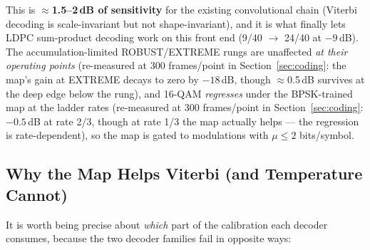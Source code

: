 This is $\approx$\textbf{1.5--2\,dB of sensitivity} for the existing
convolutional chain (Viterbi decoding is scale-invariant but not
shape-invariant), and it is what finally lets LDPC sum-product
decoding work on this front end (9/40 $\rightarrow$ 24/40 at
$-9$\,dB).  The accumulation-limited ROBUST/EXTREME rungs are
unaffected \emph{at their operating points} (re-measured at 300
frames/point in Section~\ref{sec:coding}: the map's gain at EXTREME
decays to zero by $-18$\,dB, though $\approx$0.5\,dB survives at the
deep edge below the rung), and 16-QAM \emph{regresses} under the
BPSK-trained map at the ladder rates (re-measured at 300 frames/point
in Section~\ref{sec:coding}: $-0.5$\,dB at rate 2/3, though at rate
1/3 the map actually helps --- the regression is rate-dependent), so
the map is gated to modulations with $\mu \le 2$ bits/symbol.

\subsection{Why the Map Helps Viterbi (and Temperature Cannot)}
\label{sec:viterbi_recal}

It is worth being precise about \emph{which} part of the calibration
each decoder consumes, because the two decoder families fail in
opposite ways:

